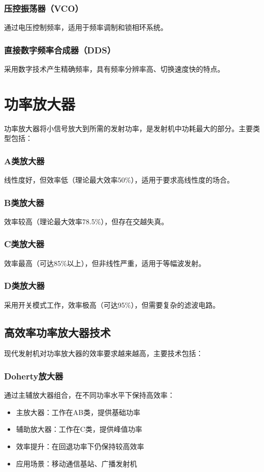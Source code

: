 \documentclass[12pt,UTF8]{ctexbook}
\begin{document}
\subsubsection{压控振荡器（VCO）}
通过电压控制频率，适用于频率调制和锁相环系统。

\subsubsection{直接数字频率合成器（DDS）}
采用数字技术产生精确频率，具有频率分辨率高、切换速度快的特点。

\section{功率放大器}

功率放大器将小信号放大到所需的发射功率，是发射机中功耗最大的部分。主要类型包括：

\subsubsection{A类放大器}
线性度好，但效率低（理论最大效率50\%），适用于要求高线性度的场合。

\subsubsection{B类放大器}
效率较高（理论最大效率78.5\%），但存在交越失真。

\subsubsection{C类放大器}
效率最高（可达85\%以上），但非线性严重，适用于等幅波发射。

\subsubsection{D类放大器}
采用开关模式工作，效率极高（可达95\%），但需要复杂的滤波电路。

\subsection{高效率功率放大器技术}

现代发射机对功率放大器的效率要求越来越高，主要技术包括：

\subsubsection{Doherty放大器}
通过主辅放大器组合，在不同功率水平下保持高效率：
\begin{itemize}[leftmargin=3.5em]
    \item 主放大器：工作在AB类，提供基础功率
    \item 辅助放大器：工作在C类，提供峰值功率
    \item 效率提升：在回退功率下仍保持较高效率
    \item 应用场景：移动通信基站、广播发射机
\end{itemize}
\end{document}
